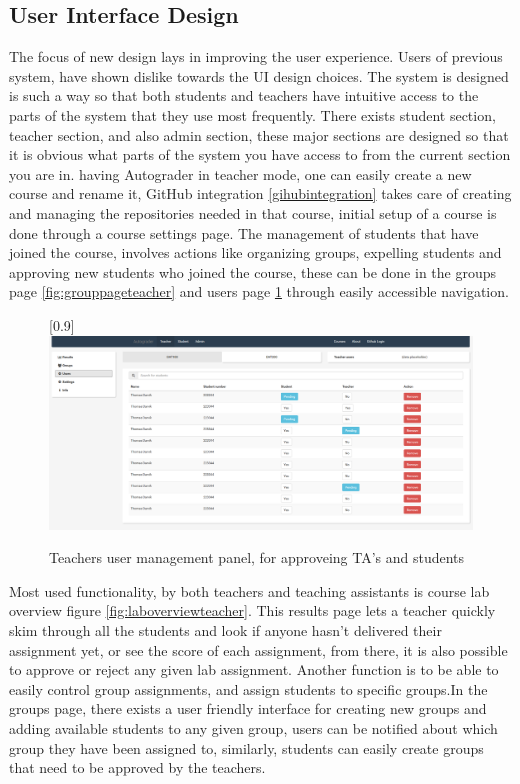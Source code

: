 \subsection{User Interface Design}
The focus of new design lays in improving the user experience. Users of previous system, have shown dislike towards the UI design choices. The system is designed is such a way so that both students and teachers have intuitive access to the parts of the system that they use most frequently. There exists student section, teacher section, and also admin section, these major sections are designed so that it is obvious what parts of the system you have access to from the current section you are in. having Autograder in teacher mode, one can easily create a new course and rename it, GitHub integration \ref{gihubintegration} takes care of creating and managing the repositories needed in that course, initial setup of a course is done through a course settings page. The management of students that have joined the course, involves actions like organizing groups, expelling students and approving new students who joined the course, these can be done in the groups page \ref{fig:grouppageteacher} and users page \ref{fig:teacherpage} through easily accessible navigation.
\begin{figure}[h]
 \scalebox{1}[0.9]{{\includegraphics[width=1\linewidth]{graphs/teacher.png}}}
  \caption{Teachers user management panel, for approveing TA's and students}
  \label{fig:teacherpage}
\end{figure}
\newpage
Most used functionality, by both teachers and teaching assistants is course lab overview figure \ref{fig:laboverviewteacher}. This results page lets a teacher quickly skim through all the students and look if anyone hasn't delivered their assignment yet, or see the score of each assignment, from there, it is also possible to approve or reject any given lab assignment. Another function is to be able to easily control group assignments, and assign students to specific groups.In the groups page, there exists a user friendly interface for creating new groups and adding available students to any given group, users can be notified about which group they have been assigned to, similarly, students can easily create groups that need to be approved by the teachers.
